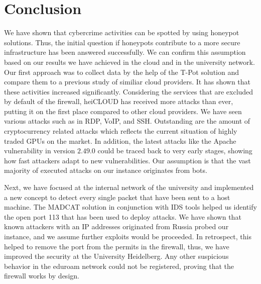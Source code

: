 \chapter{Conclusion}

We have shown that cybercrime activities can be spotted by using honeypot solutions.
Thus, the initial question if honeypots contribute to a more secure infrastructure has been answered successfully.
We can confirm this assumption based on our results we have achieved in the cloud and in the university network.
Our first approach was to collect data by the help of the T-Pot solution and compare them to a previous study of similiar cloud providers.
It has shown that these activities increased significantly.
Considering the services that are excluded by default of the firewall, heiCLOUD has received more attacks than ever, putting it on the first place compared to other cloud providers.
We have seen various attacks such as in RDP, VoIP, and SSH.
Outstanding are the amount of cryptocurrency related attacks which reflects the current situation of highly traded GPUs on the market.
In addition, the latest attacks like the Apache vulnerability in version $2.49.0$ could be traced back to very early stages, showing how fast attackers adapt to new vulnerabilities.
Our assumption is that the vast majority of executed attacks on our instance originates from bots.

Next, we have focused at the internal network of the university and implemented a new concept to detect every single packet that have been sent to a host machine.
The MADCAT solution in conjunction with IDS tools helped us identify the open port 113 that has been used to deploy attacks.
We have shown that known attackers with an IP addresses originated from Russia probed our instance, and we assume further exploits would be proceeded.
In retrospect, this helped to remove the port from the permits in the firewall, thus, we have improved the security at the University Heidelberg.
Any other suspicious behavior in the eduroam network could not be registered, proving that the firewall works by design.

